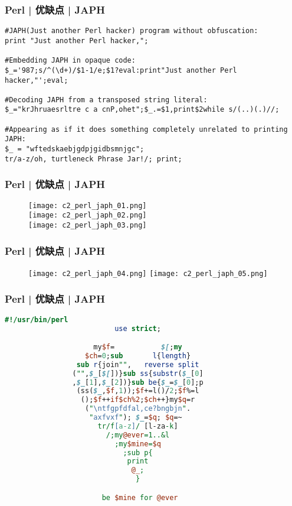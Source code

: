 \begin{frame}[fragile]
  \frametitle{Perl | 优缺点 | JAPH}
\begin{lstlisting}[basicstyle=\small\tt]
#JAPH(Just another Perl hacker) program without obfuscation:
print "Just another Perl hacker,";

#Embedding JAPH in opaque code:
$_='987;s/^(\d+)/$1-1/e;$1?eval:print"Just another Perl hacker,"';eval;

#Decoding JAPH from a transposed string literal:
$_="krJhruaesrltre c a cnP,ohet";$_.=$1,print$2while s/(..)(.)//;

#Appearing as if it does something completely unrelated to printing JAPH:
$_ = "wftedskaebjgdpjgidbsmnjgc";
tr/a-z/oh, turtleneck Phrase Jar!/; print;
\end{lstlisting}
\end{frame}

\begin{frame}
  \frametitle{Perl | 优缺点 | JAPH}
  \begin{figure}
    \centering
    \texttt{[image: c2\_perl\_japh\_01.png]}\\
    \vspace{1em}
    \texttt{[image: c2\_perl\_japh\_02.png]}\\
    \vspace{1em}
    \texttt{[image: c2\_perl\_japh\_03.png]}
  \end{figure}
\end{frame}

\begin{frame}
  \frametitle{Perl | 优缺点 | JAPH}
  \begin{figure}
    \centering
    \texttt{[image: c2\_perl\_japh\_04.png]}
    \quad
    \texttt{[image: c2\_perl\_japh\_05.png]}
  \end{figure}
\end{frame}

\begin{frame}[fragile]
  \frametitle{Perl | 优缺点 | JAPH}
  \begin{lstlisting}[language=Perl,basicstyle=\scriptsize\tt]
                        #!/usr/bin/perl
                          use strict;

                     my$f=           $[;my
                   $ch=0;sub       l{length}
                 sub r{join"",   reverse split
                ("",$_[$[])}sub ss{substr($_[0]
                ,$_[1],$_[2])}sub be{$_=$_[0];p
                 (ss($_,$f,1));$f+=l()/2;$f%=l 
                  ();$f++if$ch%2;$ch++}my$q=r
                   ("\ntfgpfdfal,ce?bngbjn".    
                    "axfvxf"); $_=$q; $q=~
                      tr/f[a-z]/ [l-za-k]
                        /;my@ever=1..&l
                          ;my$mine=$q
                            ;sub p{
                             print
                              @_;
                               }

                       be $mine for @ever
\end{lstlisting} 
\end{frame}

